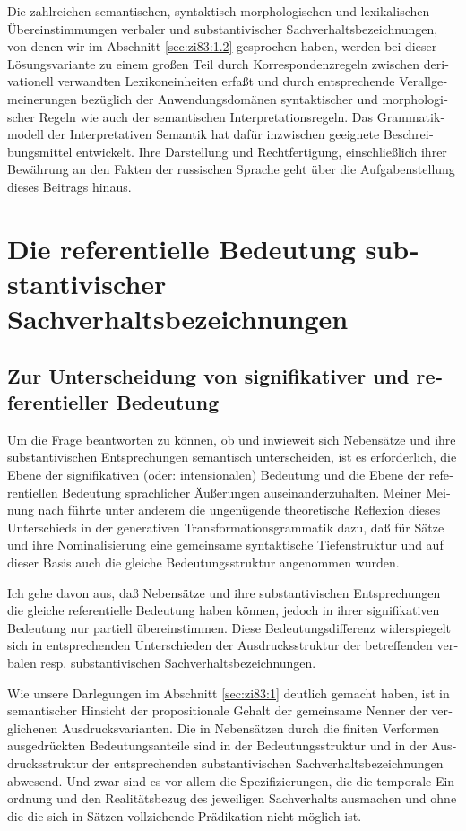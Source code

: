 \documentclass[output=paper]{langscibook}
\begin{document}
\begin{otherlanguage}{german}
Die zahlreichen semantischen, syntaktisch-morphologischen und le\-xi\-ka\-li\-schen Übereinstimmungen verbaler und substantivischer Sachverhaltsbezeichnungen, von denen wir im Abschnitt \ref{sec:zi83:1.2} gesprochen haben, werden bei dieser Lösungsva\-ri\-an\-te zu einem großen Teil durch Korrespondenzregeln zwischen derivationell verwandten Lexikoneinheiten erfaßt und durch entsprechende Verallgemeinerungen bezüglich der Anwendungsdomänen syntaktischer und morphologischer Re\-geln wie auch der semantischen Interpretationsregeln. Das Grammatikmodell der Interpretativen Semantik hat dafür inzwischen geeignete Beschreibungsmittel ent\-wi\-ckelt. Ihre Darstellung und Rechtfertigung, einschließlich ihrer Be\-wäh\-rung an den Fakten der russischen Sprache geht über die Aufgabenstellung dieses Beitrags hinaus.

\section{Die referentielle Bedeutung substantivischer Sachverhaltsbezeichnungen}\label{sec:zi83:2}

\subsection{Zur Unterscheidung von signifikativer und referentieller Bedeutung}\label{sec:zi83:2.1}

Um die Frage beantworten zu können, ob und inwieweit sich Nebensätze und ihre substantivischen Entsprechungen semantisch unterscheiden, ist es erforderlich, die Ebene der signifikativen (oder: intensionalen) Bedeutung und die Ebene der referentiellen Bedeutung sprachlicher Äußerungen auseinanderzuhalten. Mei\-ner Meinung nach führte unter anderem die ungenügende theoretische Reflexion dieses Unterschieds in der generativen Transformationsgrammatik dazu, daß für Sätze und ihre Nominalisierung eine gemeinsame syntaktische Tiefenstruktur und auf dieser Basis auch die gleiche Bedeutungsstruktur angenommen wurden.

Ich gehe davon aus, daß Nebensätze und ihre substantivischen Entsprechungen die gleiche referentielle Bedeutung haben können, jedoch in ihrer signifikativen Bedeutung nur partiell übereinstimmen. Diese Bedeutungsdifferenz widerspiegelt sich in entsprechenden Unterschieden der Ausdrucksstruktur der be\-tref\-fen\-den verbalen resp. substantivischen Sachverhaltsbezeichnungen.

Wie unsere Darlegungen im Abschnitt \ref{sec:zi83:1} deutlich gemacht haben, ist in semantischer Hinsicht der propositionale Gehalt der gemeinsame Nenner der verglichenen Ausdrucksvarianten. Die in Nebensätzen durch die finiten Verformen ausgedrückten Bedeutungsanteile sind in der Bedeutungsstruktur und in der Aus\-drucks\-struk\-tur der entsprechenden substantivischen Sach\-ver\-halts\-be\-zeich\-nun\-gen abwesend. Und zwar sind es vor allem die Spezifizierungen, die die temporale Einordnung und den Realitätsbezug des jeweiligen Sachverhalts ausmachen und ohne die die sich in Sätzen vollziehende Prädikation nicht möglich ist.


\end{otherlanguage}
\end{document}
